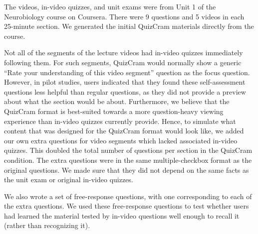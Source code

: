 \documentclass{sigchi}
\begin{document}
The videos, in-video quizzes, and unit exams were from Unit 1 of the Neurobiology course on Coursera. There were 9 questions and 5 videos in each 25-minute section. We generated the initial QuizCram materials directly from the course.



Not all of the segments of the lecture videos had in-video quizzes immediately following them. For such segments, QuizCram would normally show a generic ``Rate your understanding of this video segment'' question as the focus question. However, in pilot studies, users indicated that they found these self-assessment questions less helpful than regular questions, as they did not provide a preview about what the section would be about. Furthermore, we believe that the QuizCram format is best-suited towards a more question-heavy viewing experience than in-video quizzes currently provide. Hence, to simulate what content that was designed for the QuizCram format would look like, we added our own extra questions for video segments which lacked associated in-video quizzes. This doubled the total number of questions per section in the QuizCram condition. The extra questions were in the same multiple-checkbox format as the original questions. We made sure that they did not depend on the same facts as the unit exam or original in-video quizzes.


We also wrote a set of free-response questions, with one corresponding to each of the extra questions. We used these free-response questions to test whether users had learned the material tested by in-video questions well enough to recall it (rather than recognizing it).
\end{document}
